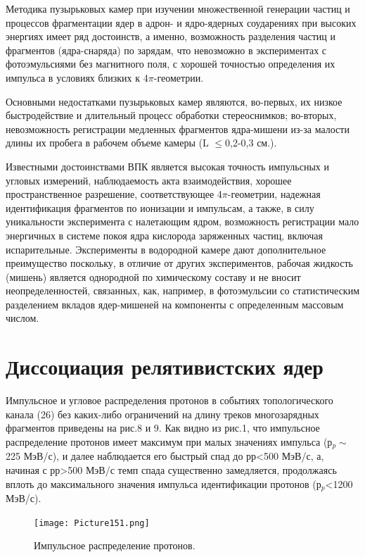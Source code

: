 \documentclass[fontsize=14pt]{scrreport}
\begin{document}
Методика пузырьковых камер при изучении множественной генерации
частиц и процессов фрагментации ядер в адрон- и ядро-ядерных соударениях при высоких энергиях имеет ряд достоинств, а именно, возможность разделения частиц и фрагментов (ядра-снаряда) по зарядам, что невозможно в экспериментах с фотоэмульсиями без магнитного поля, с хорошей точностью определения их импульса в условиях близких к 4$\pi$-геометрии.

Основными недостатками пузырьковых камер являются, во-первых, их
низкое быстродействие и длительный процесс обработки стереоснимков; во-вторых, невозможность регистрации медленных фрагментов ядра-мишени
из-за малости длины их пробега в рабочем объеме камеры (L $\le$0,2-0,3 см.).

Известными достоинствами ВПК является высокая точность импульсных и угловых измерений, наблюдаемость акта взаимодействия, хорошее пространственное разрешение, соответствующее 4$\pi$-геометрии, надежная идентификация фрагментов по ионизации и импульсам, а также, в силу уникальности эксперимента с налетающим ядром, возможность
регистрации мало энергичных в системе покоя ядра кислорода заряженных
частиц, включая испарительные. Эксперименты в водородной камере дают
дополнительное преимущество поскольку, в отличие от других
экспериментов, рабочая жидкость (мишень) является однородной по
химическому составу и не вносит неопределенностей, связанных, как, например, в фотоэмульсии со статистическим разделением вкладов ядер-мишеней на компоненты с определенным массовым числом. 


\section{Диссоциация релятивистских ядер}
\hspace{0.6cm}

Импульсное и угловое распределения протонов в событиях топологического канала (26) без каких-либо ограничений на длину треков многозарядных фрагментов приведены на рис.8 и 9. Как видно из рис.1, что импульсное распределение протонов имеет максимум при малых значениях импульса (р$_{p}\sim$225 МэВ/с), и далее наблюдается его быстрый спад до рр<500 МэВ/с, а, начиная с рр>500 МэВ/с темп спада существенно замедляется, продолжаясь вплоть до максимального значения импульса идентификации протонов (р$_{p}$<1200 МэВ/с).

\begin{figure}[!ht]
\centering
\texttt{[image: Picture151.png]}
\caption{ Импульсное распределение протонов.}
\label{figon}
\end{figure}
\end{document}
